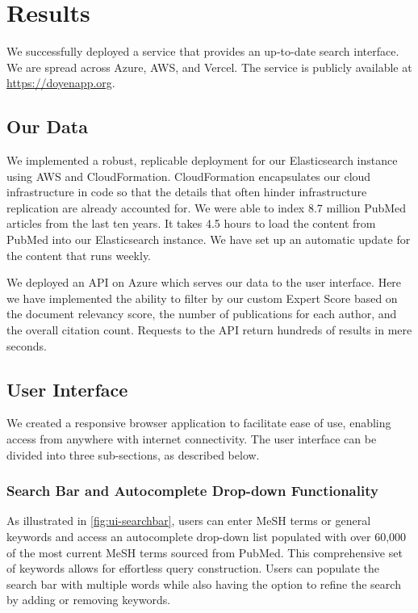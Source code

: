 \section{Results}

\def\figwidth{0.9\textwidth}

We successfully deployed a service that provides an up-to-date search interface. We are spread across Azure, AWS, and Vercel. The service is publicly available at \url{https://doyenapp.org}.

\subsection{Our Data}

We implemented a robust, replicable deployment for our Elasticsearch instance using AWS and CloudFormation. CloudFormation encapsulates our cloud infrastructure in code so that the details that often hinder infrastructure replication are already accounted for. We were able to index 8.7 million PubMed articles from the last ten years. It takes 4.5 hours to load the content from PubMed into our Elasticsearch instance. We have set up an automatic update for the content that runs weekly. 

We deployed an API on Azure which serves our data to the user interface. Here we have implemented the ability to filter by our custom Expert Score based on the document relevancy score, the number of publications for each author, and the overall citation count. Requests to the API return hundreds of results in mere seconds. 

\subsection{User Interface}

We created a responsive browser application to facilitate ease of use, enabling access from anywhere with internet connectivity. The user interface can be divided into three sub-sections, as described below. 

\subsubsection{Search Bar and Autocomplete Drop-down Functionality}

As illustrated in \autoref{fig:ui-searchbar}, users can enter MeSH terms or general keywords and access an autocomplete drop-down list populated with over 60,000 of the most current MeSH terms sourced from PubMed. This comprehensive set of keywords allows for effortless query construction. Users can populate the search bar with multiple words while also having the option to refine the search by adding or removing keywords. 

